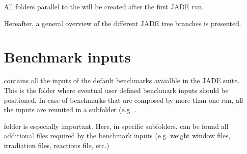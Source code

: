\documentclass[letterpaper,10pt,english]{sphinxmanual}
\begin{document}
\sphinxAtStartPar
All folders parallel to the  will be created after the first JADE run.

\sphinxAtStartPar
Hereafter, a general overview of the different JADE tree branches is presented.


\section{Benchmark inputs}
\label{\detokenize{usage/folders:benchmark-inputs}}
\sphinxAtStartPar
{} contains all the inputs of the default benchmarks avaialble in the JADE suite.
This is the folder where eventual user defined benchmark inputs should be positioned.
In case of benchmarks that are composed by more than one run, all the inputs are reunited in a sub\sphinxhyphen{}folder
(e.g. .

\sphinxAtStartPar
{} folder is especially important. Here, in specific subfolders, can be found
all additional files required by the benchmark inputs (e.g. weight window files, irradiation files, reactions file,
etc.)
\end{document}
